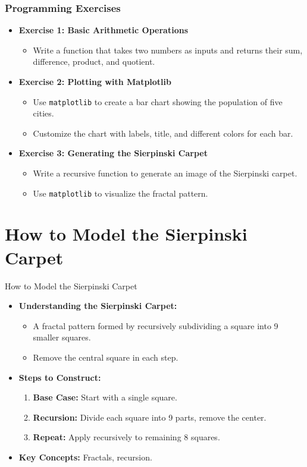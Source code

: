 \documentclass{beamer}
\begin{document}
\begin{frame}
\frametitle{Programming Exercises}
\begin{itemize}
    \item \textbf{Exercise 1: Basic Arithmetic Operations}
    \begin{itemize}
        \item Write a function that takes two numbers as inputs and returns their sum, difference, product, and quotient.
    \end{itemize}

    \item \textbf{Exercise 2: Plotting with Matplotlib}
    \begin{itemize}
        \item Use \texttt{matplotlib} to create a bar chart showing the population of five cities.
        \item Customize the chart with labels, title, and different colors for each bar.
    \end{itemize}

    \item \textbf{Exercise 3: Generating the Sierpinski Carpet}
    \begin{itemize}
        \item Write a recursive function to generate an image of the Sierpinski carpet.
        \item Use \texttt{matplotlib} to visualize the fractal pattern.
    \end{itemize}
\end{itemize}
\end{frame}

\section{How to Model the Sierpinski Carpet}
\begin{frame}{How to Model the Sierpinski Carpet}
    \begin{itemize}
        \item \textbf{Understanding the Sierpinski Carpet:}
        \begin{itemize}
            \item A fractal pattern formed by recursively subdividing a square into 9 smaller squares.
            \item Remove the central square in each step.
        \end{itemize}
        \item \textbf{Steps to Construct:}
        \begin{enumerate}
            \item \textbf{Base Case:} Start with a single square.
            \item \textbf{Recursion:} Divide each square into 9 parts, remove the center.
            \item \textbf{Repeat:} Apply recursively to remaining 8 squares.
        \end{enumerate}
        \item \textbf{Key Concepts:} Fractals, recursion.
    \end{itemize}
\end{frame}
\end{document}
